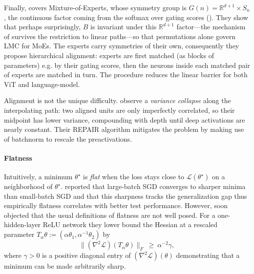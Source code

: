 \documentclass[mathematics,review,submit,moreauthors]{Definitions/mdpi}
\begin{document}
Finally, \citet{tran2025anips} covers Mixture-of-Experts, whose symmetry group is $G(n)=\mathbb{R}^{d+1}\times S_n$, the continuous factor coming from the softmax over gating scores ().
They show that perhaps surprisingly, $B$ is invariant under this $\mathbb{R}^{d+1}$ factor---the mechanism of  survives the restriction to linear paths---so that permutations alone govern LMC for MoEs.
The experts carry symmetries of their own, consequently they propose hierarchical alignment: experts are first matched (as blocks of parameters) e.g. by their gating scores, then the neurons inside each matched pair of experts are matched in turn.
The procedure reduces the linear barrier for both ViT and language-model.

\begin{Remark}
    Alignment is not the unique difficulty.
    \citet{jordan2023} observe a \emph{variance collapse} along the interpolating path: two aligned units are only imperfectly correlated, so their midpoint has lower variance, compounding with depth until deep activations are nearly constant.
    Their REPAIR algorithm mitigates the problem by making use of batchnorm to rescale the preactivations.
\end{Remark}

\paragraph{Flatness}

Intuitively, a minimum $\theta^\star$ is \emph{flat} when the loss stays close to $\mathcal{L}(\theta^\star)$ on a neighborhood of $\theta^\star$.
\citet{keskar2017} reported that large-batch SGD converges to sharper minima than small-batch SGD and that this sharpness tracks the generalization gap thus empirically flatness correlates with better test performance.
However, \citet{dinh2017} soon objected that the usual definitions of flatness are not well posed.
For a one-hidden-layer ReLU network they lower bound the Hessian at a rescaled parameter $T_\alpha\theta:=(\alpha\theta_1,\alpha^{-1}\theta_2)$ by
\begin{equation}\label{eq:dinh-hessian-bound}
    \big\lVert(\nabla^2\mathcal{L})(T_\alpha\theta)\big\rVert_F\ \ge\ \alpha^{-2}\gamma,
\end{equation}
where $\gamma>0$ is a positive diagonal entry of $(\nabla^2\mathcal{L})(\theta)$ demonstrating that a minimum can be made arbitrarily sharp.
\end{document}
